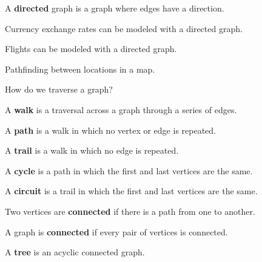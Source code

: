 \begin{definition}
	A \textbf{directed} graph is a graph where edges have a direction.
\end{definition}

\begin{eg}
	Currency exchange rates can be modeled with a directed graph.
\end{eg}

\begin{eg}
	Flights can be modeled with a directed graph.
\end{eg}

\begin{eg}
	Pathfinding between locations in a map.
\end{eg}

How do we traverse a graph?

\begin{definition}
	A \textbf{walk} is a traversal across a graph through a series of edges.
\end{definition}

\begin{definition}
	A \textbf{path} is a walk in which no vertex or edge is repeated.
\end{definition}

\begin{definition}
	A \textbf{trail} is a walk in which no edge is repeated.
\end{definition}

\begin{definition}
	A \textbf{cycle} is a path in which the first and last vertices are the same.
\end{definition}

\begin{definition}
	A \textbf{circuit} is a trail in which the first and last vertices are the same.
\end{definition}

\begin{definition}
	Two vertices are \textbf{connected} if there is a path from one to another.
\end{definition}

\begin{definition}
	A graph is \textbf{connected} if every pair of vertices is connected.
\end{definition}

\begin{definition}
	A \textbf{tree} is an acyclic connected graph.
\end{definition}

